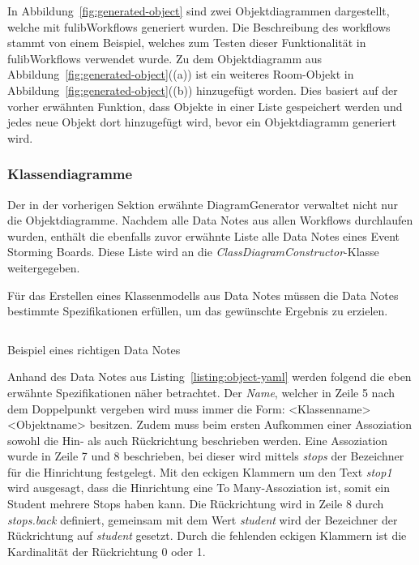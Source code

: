 In Abbildung~\ref{fig:generated-object} sind zwei Objektdiagrammen dargestellt, welche mit fulibWorkflows generiert wurden.
Die Beschreibung des workflows stammt von einem Beispiel, welches zum Testen dieser Funktionalität in fulibWorkflows verwendet wurde.\cite*{objectGenerate}
Zu dem Objektdiagramm aus Abbildung~\ref{fig:generated-object}((a)) ist ein weiteres Room-Objekt in Abbildung~\ref{fig:generated-object}((b)) hinzugefügt worden.
Dies basiert auf der vorher erwähnten Funktion, dass Objekte in einer Liste gespeichert werden und jedes neue Objekt dort hinzugefügt wird, bevor ein Objektdiagramm generiert wird.

\subsubsection{Klassendiagramme}
Der in der vorherigen Sektion erwähnte DiagramGenerator verwaltet nicht nur die Objektdiagramme.
Nachdem alle Data Notes aus allen Workflows durchlaufen wurden, enthält die ebenfalls zuvor erwähnte Liste alle Data Notes eines Event Storming Boards.
Diese Liste wird an die \textit{ClassDiagramConstructor}-Klasse weitergegeben.

Für das Erstellen eines Klassenmodells aus Data Notes müssen die Data Notes bestimmte Spezifikationen erfüllen, um das gewünschte Ergebnis zu erzielen.

\begin{listing}[!ht]
    \inputminted[firstnumber=5]{yaml}{listings/3.1.4/data.es.yaml}
    \caption{Beispiel eines richtigen Data Notes}
    \label{listing:object-yaml}
\end{listing}

Anhand des Data Notes aus Listing~\ref{listing:object-yaml} werden folgend die eben erwähnte Spezifikationen näher betrachtet.
Der \textit{Name}, welcher in Zeile 5 nach dem Doppelpunkt vergeben wird muss immer die Form: <Klassenname> <Objektname> besitzen.
Zudem muss beim ersten Aufkommen einer Assoziation sowohl die Hin- als auch Rückrichtung beschrieben werden.
Eine Assoziation wurde in Zeile 7 und 8 beschrieben, bei dieser wird mittels \textit{stops} der Bezeichner für die Hinrichtung festgelegt.
Mit den eckigen Klammern um den Text \textit{stop1} wird ausgesagt, dass die Hinrichtung eine To Many-Assoziation ist, somit ein Student mehrere Stops haben kann.
Die Rückrichtung wird in Zeile 8 durch \textit{stops.back} definiert, gemeinsam mit dem Wert \textit{student} wird der Bezeichner
der Rückrichtung auf \textit{student} gesetzt.
Durch die fehlenden eckigen Klammern ist die Kardinalität der Rückrichtung 0 oder 1.

